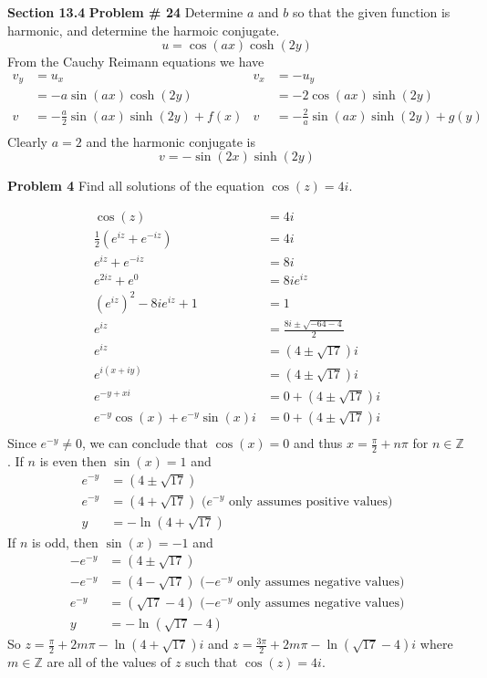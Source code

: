 \documentclass[12pt]{article}
\newcommand{\problem}[1]{\hspace{-4 ex} \large \textbf{Problem #1} }
\newcommand{\ZZ}{\mathbb{Z}}
\begin{document}
\bigbreak
{\hspace{-4 ex} \large \textbf{Section 13.4}}\bigbreak
\problem{\# 24} Determine $a$ and $b$ so that the given function is harmonic, and determine the harmoic conjugate.
$$
u = \cos(ax) \cosh(2y)
$$
	From the Cauchy Reimann equations we have
	\begin{align*}
		v_y & = u_x & v_x &= -u_y \\
		&= -a\sin(ax)\cosh(2y) & &= -2\cos(ax)\sinh(2y) \\
		v & = -\tfrac{a}{2}\sin(ax)\sinh(2y) +f(x) & v & = -\tfrac{2}{a}\sin(ax)\sinh(2y) +g(y) \\
	\end{align*}
	Clearly $a = 2$ and the harmonic conjugate is
	$$
	v = -\sin(2x)\sinh(2y)
	$$

\bigbreak
\problem{4} Find all solutions of the equation $\cos(z) = 4i$. \bigbreak

	\begin{align*}
		\cos(z) &= 4i \\
		\tfrac{1}{2}(e^{iz}+e^{-iz}) &= 4i \\
		e^{iz}+e^{-iz} &= 8i \\
		e^{2iz}+e^{0} &= 8ie^{iz} \\
		(e^{iz})^2 -8i e^{iz} + 1 & = 1 \\
		e^{iz} &= \frac{8i \pm \sqrt{-64 - 4}}{2} \\
		e^{iz} &= (4 \pm \sqrt{17})i \\
		e^{i(x+iy)} &= (4 \pm \sqrt{17})i \\
		e^{-y+xi} &= 0 + (4 \pm \sqrt{17})i \\
		e^{-y}\cos(x) + e^{-y}\sin(x)i &= 0 + (4 \pm \sqrt{17})i \\
	\end{align*}
	Since $e^{-y} \neq 0$, we can conclude that $\cos(x) = 0$ and thus $x = \tfrac{\pi}{2}+n\pi$ for $n \in \ZZ$. If $n$ is even then $\sin(x) = 1$ and 
	\begin{align*}
		e^{-y} & = (4 \pm \sqrt{17}) \\
		e^{-y} & = (4 + \sqrt{17}) \text{\ \ ($e^{-y}$ only assumes positive values)}\\
		y & = -\ln(4 + \sqrt{17})
	\end{align*} 
	If $n$ is odd, then $\sin(x) = -1$ and
	\begin{align*}
		-e^{-y} & = (4 \pm \sqrt{17}) \\
		-e^{-y} & = (4 - \sqrt{17}) \text{\ \ ($-e^{-y}$ only assumes negative values)}\\
		e^{-y} & = (\sqrt{17}-4) \text{\ \ ($-e^{-y}$ only assumes negative values)}\\
		y & = - \ln(\sqrt{17}-4)
	\end{align*}
	So $z = \tfrac{\pi}{2}+2m\pi -\ln(4 + \sqrt{17})i$ and $z = \tfrac{3\pi}{2}+2m\pi - \ln(\sqrt{17}-4)i$ where $m \in \ZZ$ are all of the values of $z$ such that $\cos(z) = 4i$.
	
\end{document}
